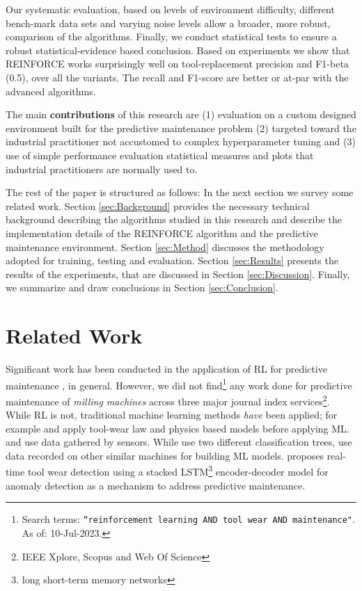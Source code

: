 \documentclass[a4paper, 12pt]{article}
\begin{document}
Our systematic evaluation, based on levels of environment difficulty, different bench-mark data sets and varying noise levels allow a broader, more robust, comparison of the algorithms. Finally, we conduct statistical tests to ensure a robust statistical-evidence based conclusion. Based on experiments we show that REINFORCE works surprisingly well on tool-replacement precision and F1-beta (0.5), over all the variants. The recall and F1-score are better or at-par with the advanced algorithms.

The main \textbf{contributions} of this research are (1) evaluation on a custom designed environment built for the predictive maintenance problem (2) targeted toward the industrial practitioner not accustomed to complex hyperparameter tuning and (3) use of simple performance evaluation statistical measures and plots that industrial practitioners are normally used to.

The rest of the paper is structured as follows: In the next section we survey some related work. Section \ref{sec:Background} provides the necessary technical background describing the algorithms studied in this research and describe the implementation details of the REINFORCE algorithm and the predictive maintenance environment. Section \ref{sec:Method} discusses the methodology adopted for training, testing and evaluation. Section \ref{sec:Results} presents the results of the experiments, that are discussed in Section \ref{sec:Discussion}. Finally, we summarize and draw conclusions in Section \ref{sec:Conclusion}.

\section{Related Work}\label{sec:SLR}
Significant work has been conducted in the application of RL for predictive maintenance \citep{Panzer2021, Erhan2021, siraskar2023}, in general. However, we did not find\footnote{Search terms: \texttt{``reinforcement learning AND tool wear AND maintenance"}. As of: 10-Jul-2023.} any work done for predictive maintenance of \textit{milling machines} across three major journal index services\footnote{IEEE Xplore\texttrademark{}, Scopus\texttrademark{} and Web Of Science\texttrademark{}}. %
While RL is not, traditional machine learning methods \textit{have} been applied; for example \cite{Qin2023} and \cite{Qiang2023} apply tool-wear law and physics based models before applying ML. \cite{Twardowski2023} and \cite{Denkena2023} use data gathered by sensors. While \cite{Twardowski2023} use two different classification trees, \cite{Denkena2023} use data recorded on other similar machines for building ML models. \cite{oshida2023development} proposes real-time tool wear detection using a stacked LSTM\footnote{long short-term memory networks} encoder-decoder model for anomaly detection as a mechanism to address predictive maintenance.  
\end{document}
